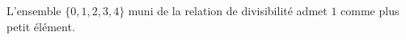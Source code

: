 L'ensemble $\{0,1,2,3,4\}$ muni de la relation de divisibilité admet $1$ comme plus petit élément.

\begin{reponses}
\end{reponses}

